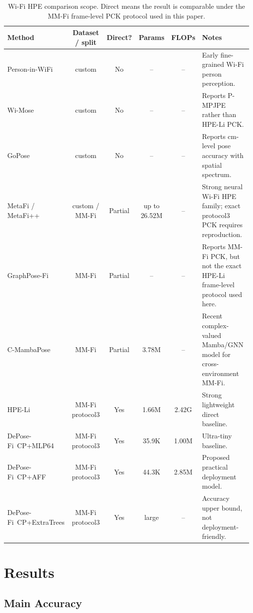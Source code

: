 \documentclass[letterpaper]{article}
\newcommand{\method}{DePose-Fi}
\begin{document}
\begin{table}[t]
\centering
\caption{Wi-Fi HPE comparison scope. Direct means the result is comparable under the MM-Fi frame-level PCK protocol used in this paper.}
\label{tab:sota_scope}
\begin{tabular}{lccccp{4.8cm}}
\toprule
Method & Dataset / split & Direct? & Params & FLOPs & Notes \\
\midrule
Person-in-WiFi & custom & No & -- & -- & Early fine-grained Wi-Fi person perception. \\
Wi-Mose & custom & No & -- & -- & Reports P-MPJPE rather than HPE-Li PCK. \\
GoPose & custom & No & -- & -- & Reports cm-level pose accuracy with spatial spectrum. \\
MetaFi / MetaFi++ & custom / MM-Fi & Partial & up to 26.52M & -- & Strong neural Wi-Fi HPE family; exact protocol3 PCK requires reproduction. \\
GraphPose-Fi & MM-Fi & Partial & -- & -- & Reports MM-Fi PCK, but not the exact HPE-Li frame-level protocol used here. \\
C-MambaPose & MM-Fi & Partial & 3.78M & -- & Recent complex-valued Mamba/GNN model for cross-environment MM-Fi. \\
HPE-Li & MM-Fi protocol3 & Yes & 1.66M & 2.42G & Strong lightweight direct baseline. \\
\method\ CP+MLP64 & MM-Fi protocol3 & Yes & 35.9K & 1.00M & Ultra-tiny baseline. \\
\method\ CP+AFF & MM-Fi protocol3 & Yes & 44.3K & 2.85M & Proposed practical deployment model. \\
\method\ CP+ExtraTrees & MM-Fi protocol3 & Yes & large & -- & Accuracy upper bound, not deployment-friendly. \\
\bottomrule
\end{tabular}
\end{table}

\section{Results}

\subsection{Main Accuracy}
\end{document}
